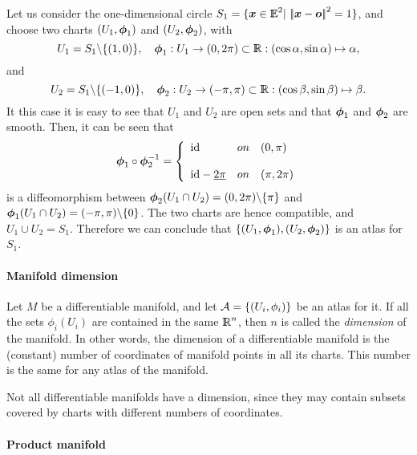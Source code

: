 \documentclass{31x47jw}
\begin{document}
\begin{example}
Let us consider the one-dimensional circle $S_{1}=\{ {\mbox{\boldmath $x$}}\in\mathbb{I\!\!E}^{2} |\ {\left|\!\left|{\mbox{\boldmath $x$}} - {\mbox{\boldmath $o$}}\right|\!\right|}^{2}=1 \}$,
and choose two charts $(U_{1},{\mbox{\boldmath $\phi$}}_{1})$ and $(U_{2},{\mbox{\boldmath $\phi$}}_{2})$, with 
\[ 
U_{1} = S_{1}\backslash\{(1,0)\}, \quad {\mbox{\boldmath $\phi$}}_{1} :
U_{1}\rightarrow(0,2\pi)\subset\mathbb{I\!\!R} : (\cos\alpha, \sin\alpha)\mapsto\alpha ,
\]
and 
\[
U_{2} = S_{1}\backslash\{(-1,0)\}, \quad {\mbox{\boldmath $\phi$}}_{2} :
U_{2}\rightarrow(-\pi,\pi)\subset\mathbb{I\!\!R} : (\cos\beta, \sin\beta)\mapsto\beta .
\]
It this case it is easy to see that $U_{1}$ and $U_{2}$ are open sets
and that ${\mbox{\boldmath $\phi$}}_{1}$ and ${\mbox{\boldmath $\phi$}}_{2}$ are smooth.  Then, it can be
seen that
\[
{\mbox{\boldmath $\phi$}}_{1}\circ{\mbox{\boldmath $\phi$}}_{2}^{-1}=\left\{
\begin{array}{lcl}
    \mbox{id} & on & (0, \pi)  \\
    \\
    \mbox{id}-\underline{2\pi} & on & (\pi, 2\pi)
\end{array}
\right.
\]
is a diffeomorphism between ${\mbox{\boldmath $\phi$}}_{2}(U_{1}\cap U_{2}) =
(0,2\pi)\backslash\{\pi\}$ and ${\mbox{\boldmath $\phi$}}_{1}(U_{1}\cap U_{2}) =
(-\pi,\pi)\backslash\{0\}$.  The two charts are hence compatible, and
$U_{1}\cup U_{2} = S_{1}$.  Therefore we can conclude that
$\{(U_{1},{\mbox{\boldmath $\phi$}}_{1}),(U_{2},{\mbox{\boldmath $\phi$}}_{2})\}$ is an atlas for $S_{1}$.

\label{ex:5:manifold}
\end{example}

\paragraph{Manifold dimension}

Let $M$ be a differentiable manifold, and let ${\cal A} = 
\{(U_{i},\phi_{i})\}$ be an atlas for it. If all the sets 
$\phi_{i}(U_{i})$ are contained in the same $\mathbb{I\!\!R}^{n}$, then $n$ is 
called the \emph{dimension} of the manifold. In other words, the dimension 
of a differentiable manifold is the (constant) number of coordinates of 
manifold points in all its charts.  This number is the same for any 
atlas of the manifold.

Not all differentiable manifolds have a dimension, since they may
contain subsets covered by charts with different numbers of
coordinates.

\paragraph{Product manifold}
\end{document}
